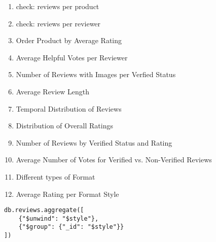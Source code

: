 \begin{enumerate}
    \item check: reviews per product
    \item check: reviews per reviewer
    \item Order Product by Average Rating
    \item Average Helpful Votes per Reviewer
    \item Number of Reviews with Images per Verfied Status
    \item Average Review Length
    \item Temporal Distribution of Reviews
    \item Distribution of Overall Ratings
    \item Number of Reviews by Verified Status and Rating
    \item Average Number of Votes for Verified vs. Non-Verified Reviews
    \item Different types of Format
    \item Average Rating per Format Style
\end{enumerate}

\begin{verbatim}
db.reviews.aggregate([
    {"$unwind": "$style"},
    {"$group": {"_id": "$style"}}
])
\end{verbatim}